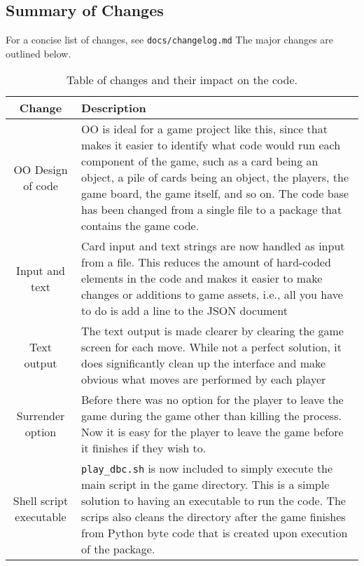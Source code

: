 \documentclass[12pt,a4paper,tightenlines]{article}
\begin{document}
\subsection{Summary of Changes}
For a concise list of changes, see \texttt{docs/changelog.md}
The major changes are outlined below.
\begin{table}[!ht]
    \begin{tabular}{|c|m{10cm}|}
        \hline
        Change & Description\\
        \hline
        OO Design of code & OO is ideal for a game project like this,
        since that makes it easier to identify what code would run 
        each component of the game, such as a card being an object,
        a pile of cards being an object, the players, the game board,
        the game itself, and so on. The code base has been changed from
        a single file to a package that contains the game code.\\
        \hline
        Input and text & Card input and text strings are now handled
        as input from a file. This reduces the amount of hard-coded
        elements in the code and makes it easier to make
        changes or additions to game assets, i.e., all you have to
        do is add a line to the JSON document\\
        \hline 
        Text output & The text output is made clearer by clearing the
        game screen for each move. While not a perfect solution, it
        does significantly clean up the interface and make obvious
        what moves are performed by each player\\
        \hline
        Surrender option & Before there was no option for the player
        to leave the game during the game other than killing the process.
        Now it is easy for the player to leave the game before it 
        finishes if they wish to.\\
        \hline
        Shell script executable & \texttt{play\_dbc.sh} is now 
        included to simply execute the main script in the game
        directory. This is a simple solution to having an executable
        to run the code. The scrips also cleans the directory after
        the game finishes from Python byte code that is created
        upon execution of the package.\\
        \hline
    \end{tabular}
    \caption{Table of changes and their impact on the code.}
\end{table}
\end{document}
